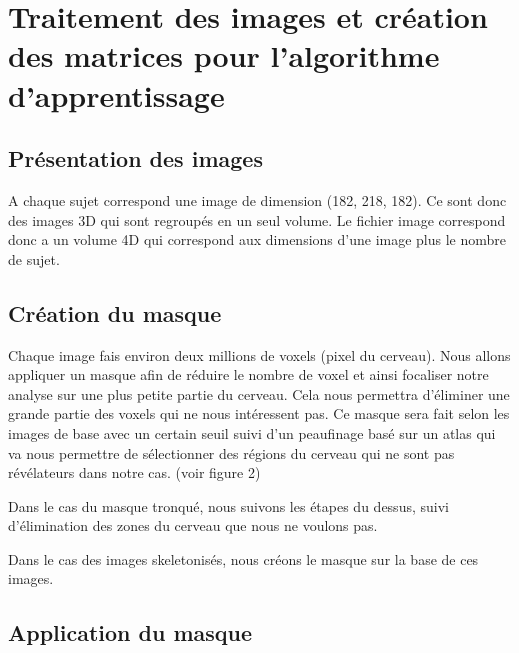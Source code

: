 \section{Traitement des images et création des matrices pour l'algorithme d'apprentissage}


\subsection{Présentation des images}

A chaque sujet correspond une image de dimension (182, 218, 182). Ce sont donc des images 3D qui sont regroupés en un seul volume. Le fichier image correspond donc a un volume 4D qui correspond aux dimensions d'une image plus le nombre de sujet.

\subsection{Création du masque}

Chaque image fais environ deux millions de voxels (pixel du cerveau). Nous allons appliquer un masque afin de réduire le nombre de voxel et ainsi focaliser notre analyse sur une plus petite partie du cerveau. Cela nous permettra d'éliminer une grande partie des voxels qui ne nous intéressent pas. 
Ce masque sera fait selon les images de base avec un certain seuil suivi d'un peaufinage basé sur un atlas qui va nous permettre de sélectionner des régions du cerveau qui ne sont pas révélateurs dans notre cas. (voir figure 2)

Dans le cas du masque tronqué, nous suivons les étapes du dessus, suivi d'élimination des zones du cerveau que nous ne voulons pas.

Dans le cas des images skeletonisés, nous créons le masque sur la base de ces images. 


\subsection{Application du masque}

